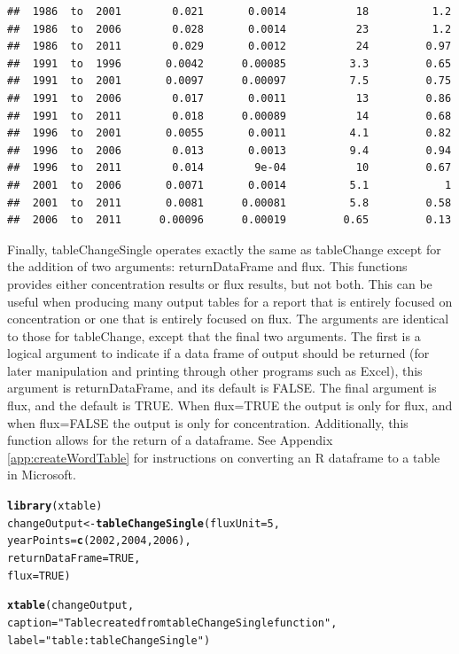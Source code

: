 \documentclass[a4paper,11pt]{article}\usepackage{graphicx, color}
\makeatletter
\newcommand{\hlfunctioncall}[1]{\textcolor[rgb]{0.501960784313725,0,0.329411764705882}{\textbf{#1}}}%
\newcommand{\hlstring}[1]{\textcolor[rgb]{0.6,0.6,1}{#1}}%
\newenvironment{kframe}{%
 \def\at@end@of@kframe{}%
 \ifinner\ifhmode%
  \def\at@end@of@kframe{\end{minipage}}%
  \begin{minipage}{\columnwidth}%
 \fi\fi%
 \def\FrameCommand##1{\hskip\@totalleftmargin \hskip-\fboxsep
 \colorbox{shadecolor}{##1}\hskip-\fboxsep
     \hskip-\linewidth \hskip-\@totalleftmargin \hskip\columnwidth}%
 \MakeFramed {\advance\hsize-\width
   \@totalleftmargin\z@ \linewidth\hsize
   \@setminipage}}%
 {\par\unskip\endMakeFramed%
 \at@end@of@kframe}
\newenvironment{knitrout}{}{} %
\makeatother
\begin{document}
\begin{knitrout}
\begin{kframe}
\begin{verbatim}
##  1986  to  2001        0.021       0.0014           18          1.2
##  1986  to  2006        0.028       0.0014           23          1.2
##  1986  to  2011        0.029       0.0012           24         0.97
##  1991  to  1996       0.0042      0.00085          3.3         0.65
##  1991  to  2001       0.0097      0.00097          7.5         0.75
##  1991  to  2006        0.017       0.0011           13         0.86
##  1991  to  2011        0.018      0.00089           14         0.68
##  1996  to  2001       0.0055       0.0011          4.1         0.82
##  1996  to  2006        0.013       0.0013          9.4         0.94
##  1996  to  2011        0.014        9e-04           10         0.67
##  2001  to  2006       0.0071       0.0014          5.1            1
##  2001  to  2011       0.0081      0.00081          5.8         0.58
##  2006  to  2011      0.00096      0.00019         0.65         0.13
\end{verbatim}
\end{kframe}
\end{knitrout}


Finally, tableChangeSingle operates exactly the same as tableChange except for the addition of two arguments: returnDataFrame and flux. This functions provides either concentration results or flux results, but not both.  This can be useful when producing many output tables for a report that is entirely focused on concentration or one that is entirely focused on flux.  The arguments are identical to those for tableChange, except that the final two arguments.  The first is a logical argument to indicate if a data frame of output should be returned (for later manipulation and printing through other programs such as Excel), this argument is returnDataFrame, and its default is FALSE.  The final argument is flux, and the default is TRUE.  When flux=TRUE the output is only for flux, and when flux=FALSE the output is only for concentration.  Additionally, this function allows for the return of a dataframe.  See Appendix \ref{app:createWordTable} for instructions on converting an R dataframe to a table in Microsoft.

\begin{knitrout}
\color{fgcolor}\begin{kframe}
\begin{alltt}
\hlfunctioncall{library}(xtable)
changeOutput <- \hlfunctioncall{tableChangeSingle}(fluxUnit=5, 
        yearPoints=\hlfunctioncall{c}(2002,2004,2006), 
        returnDataFrame = TRUE,
        flux=TRUE)

\hlfunctioncall{xtable}(changeOutput, 
        caption=\hlstring{"Table created from tableChangeSingle function"},
        label=\hlstring{"table:tableChangeSingle"})
\end{alltt}
\end{kframe}
\end{knitrout}
\end{document}
